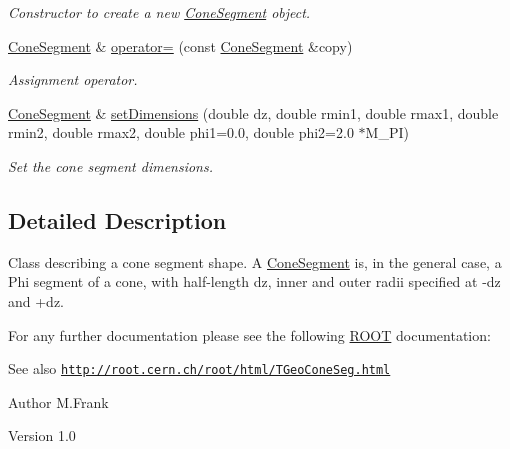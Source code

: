 \begin{DoxyCompactItemize}
\begin{DoxyCompactList}\small\item\em Constructor to create a new \hyperlink{class_d_d4hep_1_1_geometry_1_1_cone_segment}{ConeSegment} object. \item\end{DoxyCompactList}\item 
\hyperlink{class_d_d4hep_1_1_geometry_1_1_cone_segment}{ConeSegment} \& \hyperlink{class_d_d4hep_1_1_geometry_1_1_cone_segment_a3645d72628a714d02b81ac229683f3b8}{operator=} (const \hyperlink{class_d_d4hep_1_1_geometry_1_1_cone_segment}{ConeSegment} \&copy)
\begin{DoxyCompactList}\small\item\em Assignment operator. \item\end{DoxyCompactList}\item 
\hyperlink{class_d_d4hep_1_1_geometry_1_1_cone_segment}{ConeSegment} \& \hyperlink{class_d_d4hep_1_1_geometry_1_1_cone_segment_a1c5563e5b474583f16caf12a4d3f7834}{setDimensions} (double dz, double rmin1, double rmax1, double rmin2, double rmax2, double phi1=0.0, double phi2=2.0 $\ast$M\_\-PI)
\begin{DoxyCompactList}\small\item\em Set the cone segment dimensions. \item\end{DoxyCompactList}\end{DoxyCompactItemize}


\subsection{Detailed Description}
Class describing a cone segment shape. A \hyperlink{class_d_d4hep_1_1_geometry_1_1_cone_segment}{ConeSegment} is, in the general case, a Phi segment of a cone, with half-\/length dz, inner and outer radii specified at -\/dz and +dz.

For any further documentation please see the following \hyperlink{namespace_r_o_o_t}{ROOT} documentation: \begin{DoxySeeAlso}{See also}
\href{http://root.cern.ch/root/html/TGeoConeSeg.html}{\tt http://root.cern.ch/root/html/TGeoConeSeg.html}
\end{DoxySeeAlso}
\begin{DoxyAuthor}{Author}
M.Frank 
\end{DoxyAuthor}
\begin{DoxyVersion}{Version}
1.0 
\end{DoxyVersion}


